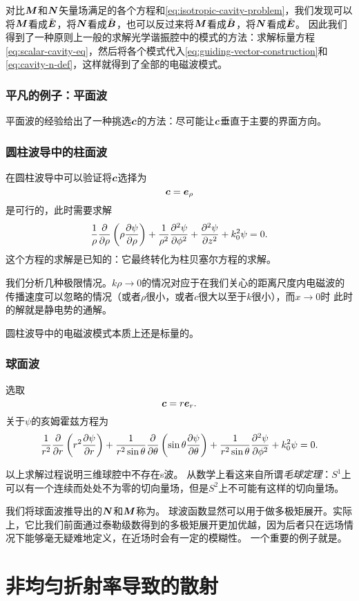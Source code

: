 对比$\vb*{M}$和$\vb*{N}$矢量场满足的各个方程和\eqref{eq:isotropic-cavity-problem}，我们发现可以将$\vb*{M}$看成$\tilde{\vb*{E}}$，将$\vb*{N}$看成$\tilde{\vb*{B}}$，也可以反过来将$\vb*{M}$看成$\tilde{\vb*{B}}$，将$\vb*{N}$看成$\tilde{\vb*{E}}$。
因此我们得到了一种原则上一般的求解光学谐振腔中的模式的方法：求解标量方程\eqref{eq:scalar-cavity-eq}，然后将各个模式代入\eqref{eq:guiding-vector-construction}和\eqref{eq:cavity-n-def}，这样就得到了全部的电磁波模式。

\subsection{平凡的例子：平面波}

平面波的经验给出了一种挑选$\vb*{c}$的方法：尽可能让$\vb*{c}$垂直于主要的界面方向。

\subsection{圆柱波导中的柱面波}

在圆柱波导中可以验证将$\vb*{c}$选择为
\begin{equation}
    \vb*{c} = \vb*{e}_\rho
\end{equation}
是可行的，此时需要求解
\begin{equation}
    \frac{1}{\rho} \pdv{\rho} \left( \rho \pdv{\psi}{\rho} \right) + \frac{1}{\rho^2} \pdv[2]{\psi}{\phi} + \pdv[2]{\psi}{z} + k_0^2 \psi = 0.
\end{equation}
这个方程的求解是已知的：它最终转化为柱贝塞尔方程的求解。


我们分析几种极限情况。$k \rho \to 0$的情况对应于在我们关心的距离尺度内电磁波的传播速度可以忽略的情况（或者$\rho$很小，或者$c$很大以至于$k$很小），而$x \to 0$时 %
此时的解就是静电势的通解。

圆柱波导中的电磁波模式本质上还是标量的。

\subsection{球面波}

选取
\begin{equation}
    \vb*{c} = r \vb*{e}_r.
\end{equation}
关于$\psi$的亥姆霍兹方程为
\begin{equation}
    \frac{1}{r^2} \pdv{r}\left( r^2 \pdv{\psi}{r} \right) + \frac{1}{r^2 \sin \theta} \pdv{\theta} \left( \sin \theta \pdv{\psi}{\theta} \right) + \frac{1}{r^2 \sin \theta} \pdv[2]{\psi}{\phi} + k_0^2 \psi = 0.
\end{equation}

以上求解过程说明三维球腔中不存在s波。
从数学上看这来自所谓\emph{毛球定理}：$S^1$上可以有一个连续而处处不为零的切向量场，但是$S^2$上不可能有这样的切向量场。

我们将球面波推导出的$\vb*{N}$和$\vb*{M}$称为。
球波函数显然可以用于做多极矩展开。实际上，它比我们前面通过泰勒级数得到的多极矩展开更加优越，因为后者只在远场情况下能够毫无疑难地定义，在近场时会有一定的模糊性。
一个重要的例子就是。

\chapter{非均匀折射率导致的散射}